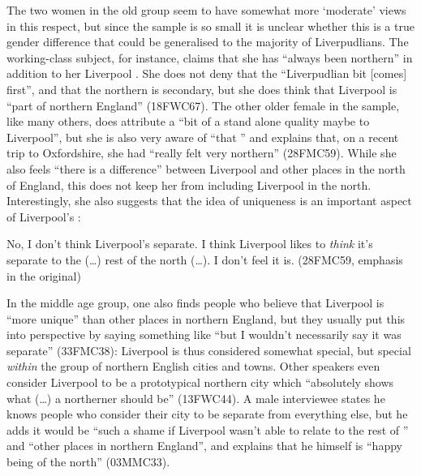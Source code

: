 The two women in the old group seem to have somewhat more `moderate' views in this respect, but since the sample is so small it is unclear whether this is a true gender difference that could be generalised to the majority of Liverpudlians.
The working-class subject, for instance, claims that she has ``always been northern'' in addition to her Liverpool .
She does not deny that the ``Liverpudlian bit [comes] first'', and that the northern  is secondary, but she does think that Liverpool is ``part of northern England'' (18FWC67).
The other older female in the sample, like many others, does attribute a ``bit of a stand alone quality maybe to Liverpool'', but she is also very aware of ``that '' and explains that, on a recent trip to Oxfordshire, she had ``really felt very northern'' (28FMC59).
While she also feels ``there is a difference'' between Liverpool and other places in the north of England, this does not keep her from including Liverpool in the north.
Interestingly, she also suggests that the idea of uniqueness is an important aspect of Liverpool's :
\begin{example}
	No, I don't think Liverpool's separate. I think Liverpool likes to \emph{think} it's separate to the (\ldots) rest of the north (\ldots). I don't feel it is. (28FMC59, emphasis in the original)
\end{example}

In the middle age group, one also finds people who believe that Liverpool is ``more unique'' than other places in northern England, but they usually put this into perspective by saying something like ``but I wouldn't necessarily say it was separate'' (33FMC38): Liverpool is thus considered somewhat special, but special \emph{within} the group of northern English cities and towns.
Other speakers even consider Liverpool to be a prototypical northern city which ``absolutely shows what (\ldots) a northerner should be'' (13FWC44).
A male interviewee states he knows people who consider their city to be separate from everything else, but he adds it would be ``such a shame if Liverpool wasn't able to relate to the rest of '' and ``other places in northern England'', and explains that he himself is ``happy being of the north'' (03MMC33).

